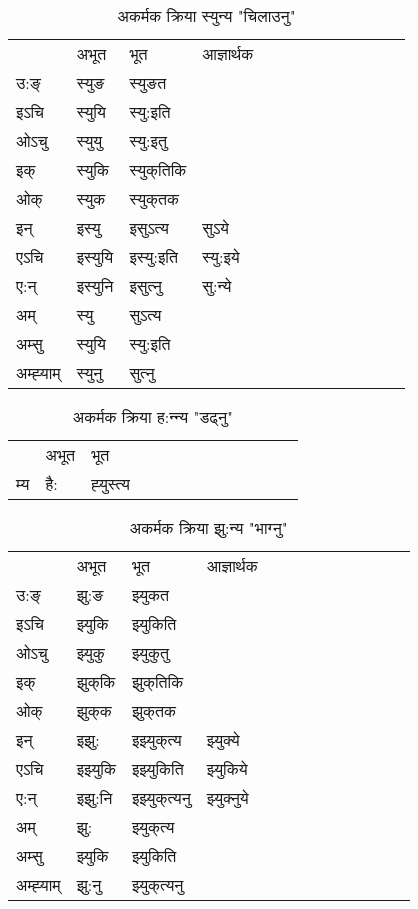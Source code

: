 \begin{table}[H]
\label{u.vi} \centering
\caption{अकर्मक क्रिया  स्युन्य  "चिलाउनु"  }
\begin{tabular}{l|l|l|l|l|l|l|l|l|l|l|l|l}  \toprule
&अभूत & भूत & आज्ञार्थक \\ 
उ:ङ्‌ &स्युङ &स्युङत \\ 
इऽचि &स्युयि &स्यु:इति   \\ 
ओऽचु &स्युयु &स्यु:इतु   \\ 
इक् &स्युकि &स्युक्‌तिकि   \\ 
ओक् &स्युक &स्युक्‌तक   \\ 
इन् & इस्यु & इसुऽत्य &सुऽये  \\ 
एऽचि & इस्युयि & इस्यु:इति &स्यु:इये    \\ 
ए:न् & इस्युनि  & इसुत्‍नु &सु:न्ये  \\ 
अम् & स्यु & सुऽत्य   \\ 
अम्सु & स्युयि & स्यु:इति     \\ 
अम्ह्‍याम् & स्युनु  & सुत्‍नु \\ 
\bottomrule
\end{tabular}
\end{table}


\begin{table}[H]
\label{ut.vi} \centering
\caption{अकर्मक क्रिया  ह:न्‍न्य  "डढ्नु"  }
\begin{tabular}{l|l|l|l|l|l|l|l|l|l|l|l|l}  \toprule
&अभूत & भूत   \\ 
म्य & है: & ह्‍युस्त्य   \\ 
\bottomrule
\end{tabular}
\end{table}


\begin{table}[H]
\label{uk.vi} \centering
\caption{अकर्मक क्रिया  झु:न्य  "भाग्नु"  }
\begin{tabular}{l|l|l|l|l|l|l|l|l|l|l|l|l}  \toprule
&अभूत & भूत & आज्ञार्थक \\ 
उ:ङ्‌ &झु:ङ &झ्युकत \\ 
इऽचि &झ्युकि &झ्युकिति   \\ 
ओऽचु &झ्युकु &झ्युकुतु   \\ 
इक् &झुक्‌कि &झुक्‌तिकि   \\ 
ओक् &झुक्‌क &झुक्‌तक   \\ 
इन् & इझु: & इझ्युक्‌त्य &झ्युक्ये  \\ 
एऽचि & इझ्युकि & इझ्युकिति &झ्युकिये    \\ 
ए:न् & इझु:नि  & इझ्युक्‌त्यनु &झ्युक्‍नुये  \\ 
अम् & झु: & झ्युक्‌त्य   \\ 
अम्सु & झ्युकि & झ्युकिति   \\ 
अम्ह्‍याम् & झु:नु  & झ्युक्‌त्यनु \\ 
\bottomrule
\end{tabular}
\end{table}


